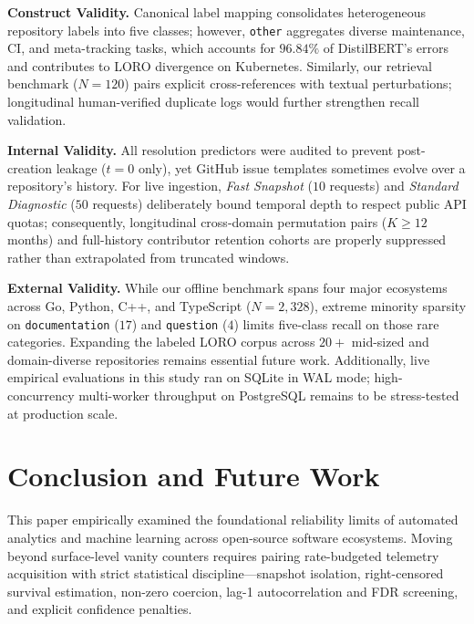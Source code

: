 \documentclass[conference]{IEEEtran}
\begin{document}
\textbf{Construct Validity.} Canonical label mapping consolidates heterogeneous repository labels into five classes; however, \texttt{other} aggregates diverse maintenance, CI, and meta-tracking tasks, which accounts for $96.84\%$ of DistilBERT's errors and contributes to LORO divergence on Kubernetes. Similarly, our retrieval benchmark ($N=120$) pairs explicit cross-references with textual perturbations; longitudinal human-verified duplicate logs would further strengthen recall validation.

\textbf{Internal Validity.} All resolution predictors were audited to prevent post-creation leakage ($t=0$ only), yet GitHub issue templates sometimes evolve over a repository's history. For live ingestion, \emph{Fast Snapshot} ($10$ requests) and \emph{Standard Diagnostic} ($50$ requests) deliberately bound temporal depth to respect public API quotas; consequently, longitudinal cross-domain permutation pairs ($K \ge 12$ months) and full-history contributor retention cohorts are properly suppressed rather than extrapolated from truncated windows.

\textbf{External Validity.} While our offline benchmark spans four major ecosystems across Go, Python, C++, and TypeScript ($N=2{,}328$), extreme minority sparsity on \texttt{documentation} ($17$) and \texttt{question} ($4$) limits five-class recall on those rare categories. Expanding the labeled LORO corpus across $20+$ mid-sized and domain-diverse repositories remains essential future work. Additionally, live empirical evaluations in this study ran on SQLite in WAL mode; high-concurrency multi-worker throughput on PostgreSQL remains to be stress-tested at production scale.

\section{Conclusion and Future Work}
\label{sec:conclusion}

This paper empirically examined the foundational reliability limits of automated analytics and machine learning across open-source software ecosystems. Moving beyond surface-level vanity counters requires pairing rate-budgeted telemetry acquisition with strict statistical discipline---snapshot isolation, right-censored survival estimation, non-zero coercion, lag-1 autocorrelation and FDR screening, and explicit confidence penalties.
\end{document}

